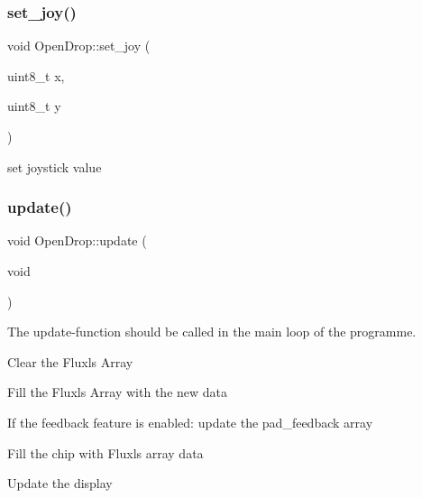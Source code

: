 \subsubsection{\texorpdfstring{set\+\_\+joy()}{set\_joy()}}
{\footnotesize\ttfamily void Open\+Drop\+::set\+\_\+joy (\begin{DoxyParamCaption}\item[{uint8\+\_\+t}]{x,  }\item[{uint8\+\_\+t}]{y }\end{DoxyParamCaption})}

set joystick value \mbox{\label{class_open_drop_a7861cb91ff543065b3cac3e5698eb1f4}} 
\subsubsection{\texorpdfstring{update()}{update()}}
{\footnotesize\ttfamily void Open\+Drop\+::update (\begin{DoxyParamCaption}\item[{void}]{ }\end{DoxyParamCaption})}

The update-\/function should be called in the main loop of the programme.~\newline

\begin{DoxyEnumerate}
\item Clear the Fluxls Array~\newline

\item Fill the Fluxls Array with the new data~\newline

\item If the feedback feature is enabled\+: update the pad\+\_\+feedback array~\newline

\item Fill the chip with Fluxls array data~\newline

\item Update the display 
\end{DoxyEnumerate}\mbox{\label{class_open_drop_a95a40fe5db3d7187c2932e301f295d12}} 
